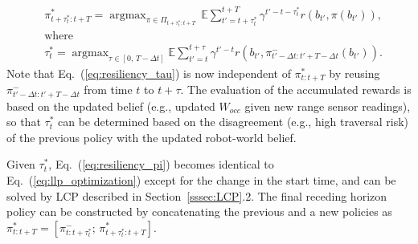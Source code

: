 \documentclass[letterpaper]{article} %
\newcommand{\argmax}{\mathop{\mathrm{argmax}}}
\begin{document}
%
%
%
\begin{align}
  & \pi_{t+\tau^*_t:t+T}^* = \argmax_{\pi \in \Pi_{t+\tau^*_t:t+T}} \, \mathbb{E} \sum_{t'=t+\tau^*_t}^{t+T} \gamma^{t'-t-\tau^*_t} r(b_{t'}, \pi(b_{t'})),
  \label{eq:resiliency_pi}
  \\
  &\text{where}
  \nonumber \\
  & \tau^*_t = \argmax_{\tau \in [0,\, T-\Delta t]} \mathbb{E} \sum_{t'=t}^{t+\tau} \gamma^{t'-t} r(b_{t'}, \pi_{{t'}-\Delta t:{t'}+T-\Delta t}^-(b_{t'})).
  \label{eq:resiliency_tau}
\end{align}
\normalsize
%
Note that Eq.~(\ref{eq:resiliency_tau}) is now independent of $\pi_{t:t+T}^*$ by reusing $\pi_{{t'}-\Delta t:{t'}+T-\Delta t}^-$ from time $t$ to $t + \tau$.
The evaluation of the accumulated rewards is based on the updated belief (e.g., updated $W_{occ}$ given new range sensor readings), so that $\tau^*_t$ can be determined based on the disagreement (e.g., high traversal risk) of the previous policy with the updated robot-world belief.

Given $\tau^*_t$, Eq.~(\ref{eq:resiliency_pi}) becomes identical to Eq.~(\ref{eq:llp_optimization}) except for the change in the start time,
and can be solved by LCP described in Section~\ref{sssec:LCP}.2.  %
%
The final receding horizon policy can be constructed by concatenating the previous and a new policies as $\pi_{t:t+T}^* = [\pi_{t:t+\tau^*_t}^-; \, \pi_{t+\tau^*_t:t+T}^*]$.
\end{document}

